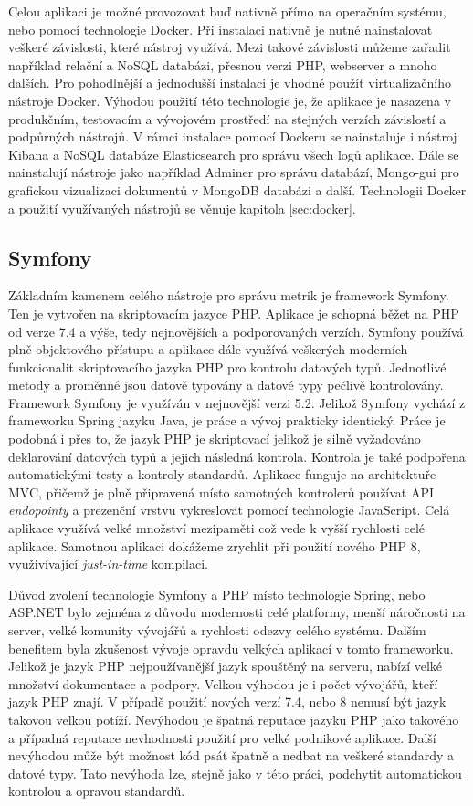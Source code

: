 \documentclass[czech,master]{diploma}
\begin{document}
Celou aplikaci je možné provozovat buď nativně přímo na operačním systému, nebo pomocí technologie Docker. Při instalaci nativně je nutné nainstalovat veškeré závislosti, které nástroj využívá. Mezi takové závislosti můžeme zařadit například relační a NoSQL databázi, přesnou verzi PHP, webserver a mnoho dalších. Pro pohodlnější a jednodušší instalaci je vhodné použít virtualizačního nástroje Docker. Výhodou použití této technologie je, že aplikace je nasazena v produkčním, testovacím a vývojovém prostředí na stejných verzích závislostí a podpůrných nástrojů. V rámci instalace pomocí Dockeru se nainstaluje i nástroj Kibana a NoSQL databáze Elasticsearch pro správu všech logů aplikace. Dále se nainstalují nástroje jako například Adminer pro správu databází,  Mongo-gui pro grafickou vizualizaci dokumentů v MongoDB databázi a další. Technologii Docker a použití využívaných nástrojů se věnuje kapitola \ref{sec:docker}.

\subsection{Symfony}
\label{sec:symfony}
Základním kamenem celého nástroje pro správu metrik je framework Symfony. Ten je vytvořen na skriptovacím jazyce PHP. Aplikace je schopná běžet na PHP od verze 7.4 a výše, tedy nejnovějších a podporovaných verzích. Symfony používá plně objektového přístupu a aplikace dále využívá veškerých moderních funkcionalit skriptovacího jazyka PHP pro kontrolu datových typů. Jednotlivé metody a proměnné jsou datově typovány a datové typy pečlivě kontrolovány. Framework Symfony je využíván v nejnovější verzi 5.2. Jelikož Symfony vychází z frameworku Spring jazyku Java, je práce a vývoj prakticky identický. Práce je podobná i přes to, že jazyk PHP je skriptovací jelikož je silně vyžadováno deklarování datových typů a jejich následná kontrola. Kontrola je také podpořena automatickými testy a kontroly standardů. Aplikace funguje na architektuře MVC, přičemž je plně připravená místo samotných kontrolerů používat API \textit{endopointy} a prezenční vrstvu vykreslovat pomocí technologie JavaScript. Celá aplikace využívá velké množství mezipaměti což vede k vyšší rychlosti celé aplikace. Samotnou aplikaci dokážeme zrychlit při použití nového PHP 8, využivívající \textit{just-in-time} kompilaci.

Důvod zvolení technologie Symfony a PHP místo technologie Spring, nebo ASP.NET bylo zejména z důvodu modernosti celé platformy, menší náročnosti na server, velké komunity vývojářů a rychlosti odezvy celého systému. Dalším benefitem byla zkušenost vývoje opravdu velkých aplikací v tomto frameworku. Jelikož je jazyk PHP nejpoužívanější jazyk spouštěný na serveru, nabízí velké množství dokumentace a podpory. \cite{ref:php_trend} Velkou výhodou je i počet vývojářů, kteří jazyk PHP znají.  V případě použití nových verzí 7.4, nebo 8 nemusí být jazyk takovou velkou potíží. Nevýhodou je špatná reputace jazyku PHP jako takového a případná reputace nevhodnosti použití pro velké podnikové aplikace. Další nevýhodou může být možnost kód psát špatně a nedbat na veškeré standardy a datové typy. Tato nevýhoda lze, stejně jako v této práci, podchytit automatickou kontrolou a opravou standardů.
\end{document}
